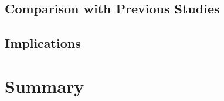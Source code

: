 \documentclass[12pt, a4paper]{article}
\begin{document}
\subsection{Comparison with Previous Studies}


\subsection{Implications}


\section{Summary}





\end{document}
